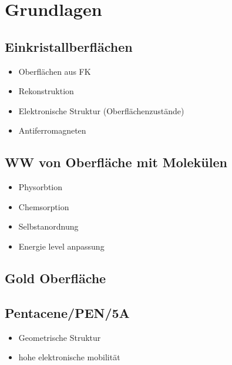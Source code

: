 \chapter{Grundlagen}
\section{Einkristallberflächen}
    \begin{itemize}
        \item Oberflächen aus FK
        \item Rekonstruktion
        \item Elektronische Struktur (Oberflächenzustände)
        \item Antiferromagneten
    \end{itemize}
\section{WW von Oberfläche mit Molekülen}
    \begin{itemize}
        \item Physorbtion
        \item Chemsorption
        \item Selbstanordnung
        \item Energie level anpassung
    \end{itemize}
\section{Gold Oberfläche}

\section{Pentacene/PEN/5A}
\begin{itemize}
    \item Geometrische Struktur
    \item hohe elektronische mobilität
\end{itemize}



